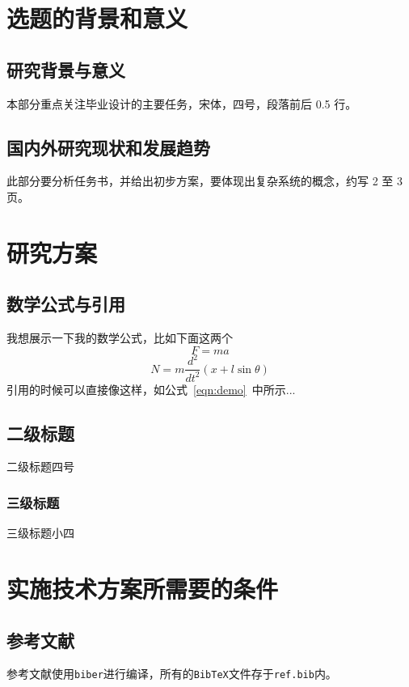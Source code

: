 \documentclass[UTF8,AutoFakeBold,AutoFakeSlant,zihao=-4]{ctexart}
\begin{document}
\newpage
\section{选题的背景和意义}
\begin{ubox}
\subsection{研究背景与意义}
本部分重点关注毕业设计的主要任务，宋体，四号，段落前后 0.5 行。

\subsection{国内外研究现状和发展趋势}
此部分要分析任务书，并给出初步方案，要体现出复杂系统的概念，约写 2 至 3 页。
\end{ubox}



\newpage
\section{研究方案}
\begin{ubox}
\subsection{数学公式与引用}

我想展示一下我的数学公式，比如下面这两个
\begin{equation}\label{eqn:demo}
	F = ma
\end{equation}
\begin{equation}
	N=m \frac{d^{2}}{d t^{2}}(x+l \sin \theta)
\end{equation}
引用的时候可以直接像这样，如公式~\ref{eqn:demo}~中所示...


\subsection{二级标题}

二级标题四号

\subsubsection{三级标题}

三级标题小四

\end{ubox}

\newpage
\section{实施技术方案所需要的条件}
\begin{ubox}
\subsection{参考文献}

参考文献使用\texttt{biber}进行编译，所有的\texttt{BibTeX}文件存于\texttt{ref.bib}内。
\subsection{}
\end{ubox}
\end{document}
